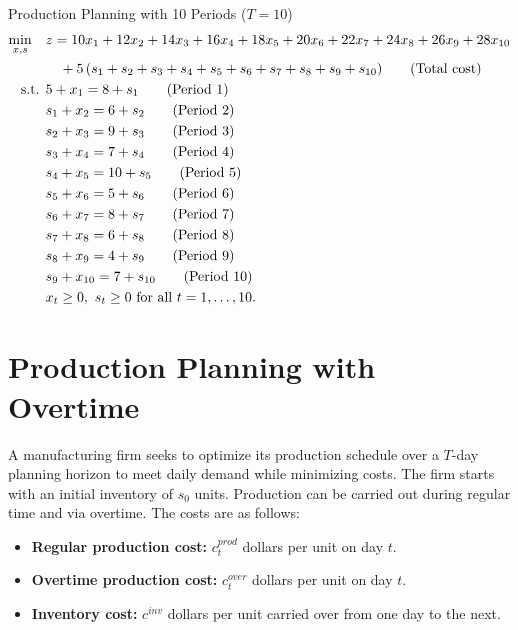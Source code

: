 \begin{examplewithallcode}{Production Planning with 10 Periods (\(T = 10\))}
\begin{align*}
\min_{x,s} \quad & z = 10x_1 + 12x_2 + 14x_3 + 16x_4 + 18x_5 + 20x_6 + 22x_7 + 24x_8 + 26x_9 + 28x_{10} \\
                 & \quad + 5\,(s_1+s_2+s_3+s_4+s_5+s_6+s_7+s_8+s_9+s_{10})   \tag{Total cost} \\
\mbox{ s.t. }        & 5 + x_1 = 8 + s_1   \tag{Period 1} \\
                 & s_1 + x_2 = 6 + s_2   \tag{Period 2} \\
                 & s_2 + x_3 = 9 + s_3   \tag{Period 3} \\
                 & s_3 + x_4 = 7 + s_4   \tag{Period 4} \\
                 & s_4 + x_5 = 10 + s_5   \tag{Period 5} \\
                 & s_5 + x_6 = 5 + s_6   \tag{Period 6} \\
                 & s_6 + x_7 = 8 + s_7   \tag{Period 7} \\
                 & s_7 + x_8 = 6 + s_8   \tag{Period 8} \\
                 & s_8 + x_9 = 4 + s_9   \tag{Period 9} \\
                 & s_9 + x_{10} = 7 + s_{10}   \tag{Period 10} \\
                 & x_t \geq 0,\ s_t \geq 0 \mbox{ for all } t=1,\dots,10.
\end{align*}
\end{examplewithallcode}

\section*{Production Planning with Overtime}

A manufacturing firm seeks to optimize its production schedule over a \(T\)-day planning horizon to meet daily demand while minimizing costs. The firm starts with an initial inventory of \(s_0\) units. Production can be carried out during regular time and via overtime. The costs are as follows:
\begin{itemize}
    \item \textbf{Regular production cost:} \(c^{prod}_t\) dollars per unit on day \(t\).
    \item \textbf{Overtime production cost:} \(c^{over}_{t}\) dollars per unit on day \(t\).
    \item \textbf{Inventory cost:} \(c^{inv}\) dollars per unit carried over from one day to the next.
\end{itemize}

